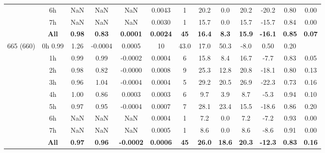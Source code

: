 \documentclass[preview]{standalone}
\begin{document}
\begin{tabular}{ccccccccccccc}
& 6h   & NaN & NaN & NaN & 0.0043 &  1 & 20.2 & 0.0 & 20.2 & -20.2 & 0.80 & 0.00 \\ 
& 7h   & NaN & NaN & NaN & 0.0030 &  1 & 15.7 & 0.0 & 15.7 & -15.7 & 0.84 & 0.00 \\ \cline{2-13}
 & \textbf{All} & \textbf{0.98} & \textbf{0.83} & \textbf{0.0001} & \textbf{0.0024} & \textbf{45} & \textbf{16.4} & \textbf{8.3} & \textbf{15.9} & \textbf{-16.1} & \textbf{0.85} & \textbf{0.07} \\ \hline
\multirow{9}{*}{665 (660)} & 0h  0.99 & 1.26 & -0.0004 & 0.0005 & 10 & 43.0 & 17.0 & 50.3 & -8.0 & 0.50 & 0.20 \\ 
& 1h   & 0.99 & 0.99 & -0.0002 & 0.0004 &  6 & 15.8 & 8.4 & 16.7 & -7.7 & 0.83 & 0.05 \\ 
& 2h   & 0.98 & 0.82 & -0.0000 & 0.0008 &  9 & 25.3 & 12.8 & 20.8 & -18.1 & 0.80 & 0.13 \\ 
& 3h   & 0.96 & 1.04 & -0.0004 & 0.0004 &  5 & 29.2 & 20.5 & 26.9 & -22.3 & 0.73 & 0.16 \\ 
& 4h   & 1.00 & 0.86 & 0.0003 & 0.0003 &  6 & 9.7 & 3.9 & 8.7 & -5.3 & 0.94 & 0.10 \\ 
& 5h   & 0.97 & 0.95 & -0.0004 & 0.0007 &  7 & 28.1 & 23.4 & 15.5 & -18.6 & 0.86 & 0.20 \\ 
& 6h   & NaN & NaN & NaN & 0.0004 &  1 & 7.2 & 0.0 & 7.2 & -7.2 & 0.93 & 0.00 \\ 
& 7h   & NaN & NaN & NaN & 0.0005 &  1 & 8.6 & 0.0 & 8.6 & -8.6 & 0.91 & 0.00 \\ \cline{2-13}
 & \textbf{All} & \textbf{0.97} & \textbf{0.96} & \textbf{-0.0002} & \textbf{0.0006} & \textbf{45} & \textbf{26.0} & \textbf{18.6} & \textbf{20.3} & \textbf{-12.3} & \textbf{0.83} & \textbf{0.16}\\ 
\hline 
\end{tabular}
\end{document}
